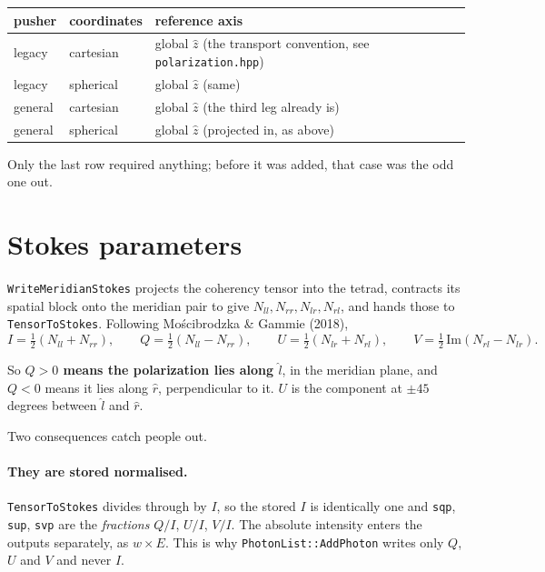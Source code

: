 \documentclass[11pt]{article}
\newcommand{\lhat}{\hat{l}}
\newcommand{\rhat}{\hat{r}}
\begin{document}
\begin{table}[h]
\centering
\begin{tabular}{lll}
\toprule
pusher & coordinates & reference axis \\
\midrule
legacy  & cartesian & global $\hat{z}$ (the transport convention, see \texttt{polarization.hpp}) \\
legacy  & spherical & global $\hat{z}$ (same) \\
general & cartesian & global $\hat{z}$ (the third leg already is) \\
general & spherical & global $\hat{z}$ (projected in, as above) \\
\bottomrule
\end{tabular}
\end{table}

Only the last row required anything; before it was added, that case was the odd one out.

\section{Stokes parameters}

\texttt{WriteMeridianStokes} projects the coherency tensor into the tetrad, contracts its
spatial block onto the meridian pair to give $N_{ll}, N_{rr}, N_{lr}, N_{rl}$, and hands
those to \texttt{TensorToStokes}. Following Mo\'scibrodzka \& Gammie (2018),
\begin{equation}
  I = \tfrac{1}{2}\left( N_{ll} + N_{rr} \right) , \qquad
  Q = \tfrac{1}{2}\left( N_{ll} - N_{rr} \right) , \qquad
  U = \tfrac{1}{2}\left( N_{lr} + N_{rl} \right) , \qquad
  V = \tfrac{1}{2}\,\mathrm{Im}\left( N_{rl} - N_{lr} \right) .
\end{equation}

So \textbf{$Q>0$ means the polarization lies along $\lhat$}, in the meridian plane, and
$Q<0$ means it lies along $\rhat$, perpendicular to it. $U$ is the component at $\pm 45$
degrees between $\lhat$ and $\rhat$.

Two consequences catch people out.

\paragraph{They are stored normalised.} \texttt{TensorToStokes} divides through by $I$, so
the stored $I$ is identically one and \texttt{sqp}, \texttt{sup}, \texttt{svp} are the
\emph{fractions} $Q/I$, $U/I$, $V/I$. The absolute intensity enters the outputs separately,
as $w \times E$. This is why \texttt{PhotonList::AddPhoton} writes only $Q$, $U$ and $V$ and
never $I$.
\end{document}
